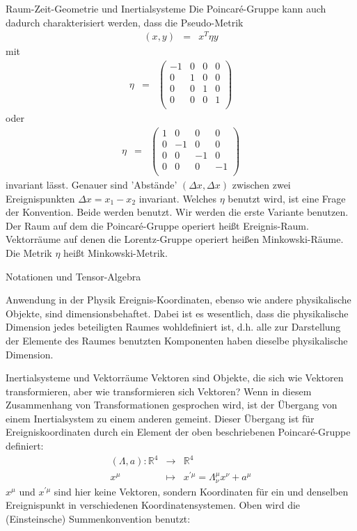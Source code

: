 \begin{chapter}{\titlestr}
\begin{section}{Raum-Zeit-Geometrie und Inertialsysteme}
Die Poincaré-Gruppe kann auch dadurch charakterisiert werden, dass die Pseudo-Metrik
\begin{eqnarray*}
(x,y) &=& x^T\eta y
\end{eqnarray*}
mit
\begin{eqnarray*}
\eta &=& \begin{pmatrix}
-1 & 0 & 0 & 0\\
0 & 1 & 0 & 0\\
0 & 0 & 1 & 0\\
0 & 0 & 0 & 1\\
\end{pmatrix}
\end{eqnarray*}
oder\begin{eqnarray*}
\eta &=& \begin{pmatrix}
1 & 0 & 0 & 0\\
0 & -1 & 0 & 0\\
0 & 0 & -1 & 0\\
0 & 0 & 0 & -1\\
\end{pmatrix}
\end{eqnarray*}
invariant lässt. Genauer sind 'Abstände' $(\Delta x,\Delta x)$ zwischen zwei Ereignispunkten $\Delta x = x_1-x_2$ invariant.
Welches $\eta$ benutzt wird, ist eine Frage der Konvention. Beide werden benutzt. Wir werden die erste Variante benutzen.
Der Raum auf dem die Poincaré-Gruppe operiert heißt Ereignis-Raum. Vektorräume auf denen die Lorentz-Gruppe operiert heißen Minkowski-Räume. Die Metrik $\eta$ heißt Minkowski-Metrik.
\end{section}

\begin{section}{Notationen und Tensor-Algebra}
\begin{subsection}{Anwendung in der Physik}
Ereignis-Koordinaten, ebenso wie andere physikalische Objekte, sind dimensionsbehaftet. Dabei ist es wesentlich, dass die physikalische
Dimension jedes beteiligten Raumes wohldefiniert ist, d.h. alle zur Darstellung der Elemente des Raumes benutzten Komponenten haben dieselbe physikalische Dimension.
\end{subsection}

\begin{subsection}{Inertialsysteme und Vektorräume}
Vektoren sind Objekte, die sich wie Vektoren transformieren, aber wie transformieren sich Vektoren? Wenn in diesem Zusammenhang von Transformationen gesprochen wird, ist der Übergang von einem Inertialsystem zu einem anderen gemeint. Dieser Übergang ist für Ereigniskoordinaten durch ein Element der oben beschriebenen Poincaré-Gruppe definiert:
\begin{eqnarray*}
(\Lambda,a): \mathbb{R}^4 &\rightarrow& \mathbb{R}^4\\
x^\mu &\mapsto& x^{\prime\mu}=\Lambda^\mu_\nu x^\nu+a^\mu
\end{eqnarray*}
$x^\mu$ und $x^{\prime\mu}$ sind hier keine Vektoren, sondern Koordinaten für ein und denselben Ereignispunkt in verschiedenen Koordinatensystemen. Oben wird die (Einsteinsche) Summenkonvention benutzt:


\end{subsection}
\end{section}
\end{chapter}
